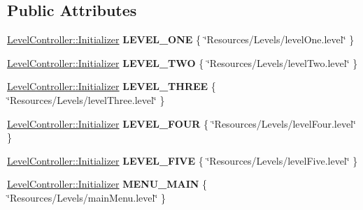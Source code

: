\subsection*{Public Attributes}
\begin{DoxyCompactItemize}
\item 
\hypertarget{class_level_controller_aed3a20ba260b3562516561bc065fd3de}{\hyperlink{class_level_controller_1_1_initializer}{Level\+Controller\+::\+Initializer} {\bfseries L\+E\+V\+E\+L\+\_\+\+O\+N\+E} \{ \char`\"{}Resources/Levels/level\+One.\+level\char`\"{} \}}\label{class_level_controller_aed3a20ba260b3562516561bc065fd3de}

\item 
\hypertarget{class_level_controller_a83feeec328501b067d422301c5b5cea6}{\hyperlink{class_level_controller_1_1_initializer}{Level\+Controller\+::\+Initializer} {\bfseries L\+E\+V\+E\+L\+\_\+\+T\+W\+O} \{ \char`\"{}Resources/Levels/level\+Two.\+level\char`\"{} \}}\label{class_level_controller_a83feeec328501b067d422301c5b5cea6}

\item 
\hypertarget{class_level_controller_a0d73c813ab9ed413b8821c19d03e4b2e}{\hyperlink{class_level_controller_1_1_initializer}{Level\+Controller\+::\+Initializer} {\bfseries L\+E\+V\+E\+L\+\_\+\+T\+H\+R\+E\+E} \{ \char`\"{}Resources/Levels/level\+Three.\+level\char`\"{} \}}\label{class_level_controller_a0d73c813ab9ed413b8821c19d03e4b2e}

\item 
\hypertarget{class_level_controller_af795ecf4216b61bcb8068ec80d2a2246}{\hyperlink{class_level_controller_1_1_initializer}{Level\+Controller\+::\+Initializer} {\bfseries L\+E\+V\+E\+L\+\_\+\+F\+O\+U\+R} \{ \char`\"{}Resources/Levels/level\+Four.\+level\char`\"{} \}}\label{class_level_controller_af795ecf4216b61bcb8068ec80d2a2246}

\item 
\hypertarget{class_level_controller_a634c5a8bde652242d217999ddc743e6d}{\hyperlink{class_level_controller_1_1_initializer}{Level\+Controller\+::\+Initializer} {\bfseries L\+E\+V\+E\+L\+\_\+\+F\+I\+V\+E} \{ \char`\"{}Resources/Levels/level\+Five.\+level\char`\"{} \}}\label{class_level_controller_a634c5a8bde652242d217999ddc743e6d}

\item 
\hypertarget{class_level_controller_ad4835322127c6b5d093be8f8ea1735bd}{\hyperlink{class_level_controller_1_1_initializer}{Level\+Controller\+::\+Initializer} {\bfseries M\+E\+N\+U\+\_\+\+M\+A\+I\+N} \{ \char`\"{}Resources/Levels/main\+Menu.\+level\char`\"{} \}}\label{class_level_controller_ad4835322127c6b5d093be8f8ea1735bd}


\end{DoxyCompactItemize}
